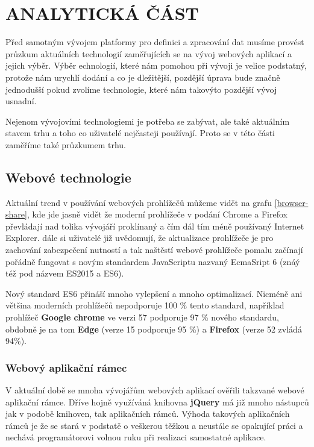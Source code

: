 \chapter{ANALYTICKÁ ČÁST} \label{analyza}
\par Před samotným vývojem platformy pro definici a zpracování dat musíme provést průzkum aktuálních technologií zaměřujících se na vývoj webových aplikací a jejich výběr. Výběr echnologií, které nám pomohou při vývoji je velice podstatný, protože nám urychlí dodání a co je dležitější, pozdější úprava bude značně jednodušší pokud zvolíme technologie, které nám takovýto pozdější vývoj usnadní.

\par Nejenom vývojovími technologiemi je potřeba se zabývat, ale také aktuálním stavem trhu a toho co uživatelé nejčasteji používají. Proto se v této části zaměříme také průzkumem trhu.

\section{Webové technologie}
\par Aktuální trend v používání webových prohlížečů můžeme vidět na grafu \ref{browser-share}, kde jde jasně vidět že moderní prohlížeče v podání Chrome a Firefox převládají nad tolika vývojáří proklínaný a čím dál tím méně používaný Internet Explorer. dále si uživatelé již uvědomují, že aktualizace prohlížeče je pro zachování zabezpečení nutností a tak naštěstí webové prohlížeče pomalu začínají pořádně fungovat s novým standardem JavaScriptu nazvaný EcmaSript 6 (znáý též pod názvem ES2015 a ES6). \cite{es6}

\par Nový standard ES6 přináší mnoho vylepšení a mnoho optimalizací. Nicméně ani většina moderních prohlížečů nepodporuje 100 \% tento standard, například prohlížeč \textbf{Google chrome} ve verzi 57 podporuje 97 \% nového standardu, obdobně je na tom \textbf{Edge} (verze 15 podporuje 95 \%) a \textbf{Firefox} (verze 52 zvládá 94\%). \cite{es6-coverage}

\subsection{Webový aplikační rámec}
\par V aktuální době se mnoha vývojářům webových aplikací ověřili takzvané webové aplikační rámce. Dříve hojně využíváná knihovna  \textbf{jQuery} má již mnoho nástupců jak v podobě knihoven, tak aplikačních rámců. Výhoda takových aplikačních rámců je že se stará v podstatě o veškerou těžkou a neustále se opakující práci a nechává programátorovi volnou ruku při realizaci samostatné aplikace. \cite{framework}

